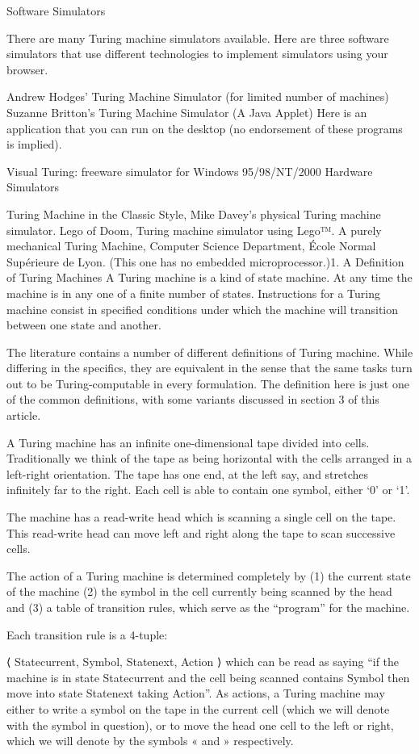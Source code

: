 Software Simulators

There are many Turing machine simulators available. Here are three software simulators that use different technologies to implement simulators using your browser.

Andrew Hodges' Turing Machine Simulator (for limited number of machines)
Suzanne Britton's Turing Machine Simulator (A Java Applet)
Here is an application that you can run on the desktop (no endorsement of these programs is implied).

Visual Turing: freeware simulator for Windows 95/98/NT/2000
Hardware Simulators

Turing Machine in the Classic Style, Mike Davey's physical Turing machine simulator.
Lego of Doom, Turing machine simulator using Lego™.
A purely mechanical Turing Machine, Computer Science Department, École Normal Supérieure de Lyon. (This one has no embedded microprocessor.)1. A Definition of Turing Machines
A Turing machine is a kind of state machine. At any time the machine is in any one of a finite number of states. Instructions for a Turing machine consist in specified conditions under which the machine will transition between one state and another.

The literature contains a number of different definitions of Turing machine. While differing in the specifics, they are equivalent in the sense that the same tasks turn out to be Turing-computable in every formulation. The definition here is just one of the common definitions, with some variants discussed in section 3 of this article.

A Turing machine has an infinite one-dimensional tape divided into cells. Traditionally we think of the tape as being horizontal with the cells arranged in a left-right orientation. The tape has one end, at the left say, and stretches infinitely far to the right. Each cell is able to contain one symbol, either ‘0’ or ‘1’.

The machine has a read-write head which is scanning a single cell on the tape. This read-write head can move left and right along the tape to scan successive cells.

The action of a Turing machine is determined completely by (1) the current state of the machine (2) the symbol in the cell currently being scanned by the head and (3) a table of transition rules, which serve as the “program” for the machine.

Each transition rule is a 4-tuple:

⟨ Statecurrent, Symbol, Statenext, Action ⟩
which can be read as saying “if the machine is in state Statecurrent and the cell being scanned contains Symbol then move into state Statenext taking Action”. As actions, a Turing machine may either to write a symbol on the tape in the current cell (which we will denote with the symbol in question), or to move the head one cell to the left or right, which we will denote by the symbols « and » respectively.

